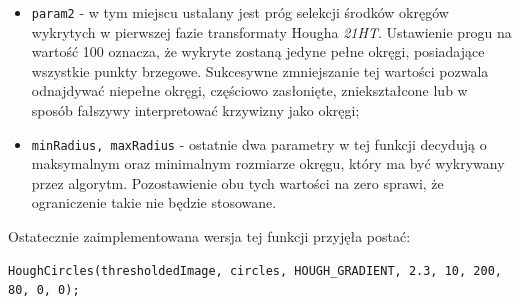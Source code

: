 \begin{itemize}
\item \texttt{param2} - w tym miejscu ustalany jest próg selekcji środków okręgów wykrytych w pierwszej fazie transformaty Hougha \textit{21HT}. Ustawienie progu na wartość 100 oznacza, że wykryte zostaną jedyne pełne okręgi, posiadające wszystkie punkty brzegowe. Sukcesywne zmniejszanie tej wartości pozwala odnajdywać niepełne okręgi, częściowo zasłonięte, zniekształcone lub w sposób fałszywy interpretować krzywizny jako okręgi;
\item \texttt{minRadius, maxRadius} - ostatnie dwa parametry w tej funkcji decydują o maksymalnym oraz minimalnym rozmiarze okręgu, który ma być wykrywany przez algorytm. Pozostawienie obu tych wartości na zero sprawi, że ograniczenie takie nie będzie stosowane.
\end{itemize}

Ostatecznie zaimplementowana wersja tej funkcji przyjęła postać:
\begin{lstlisting}
HoughCircles(thresholdedImage, circles, HOUGH_GRADIENT, 2.3, 10, 200, 80, 0, 0);
\end{lstlisting}

